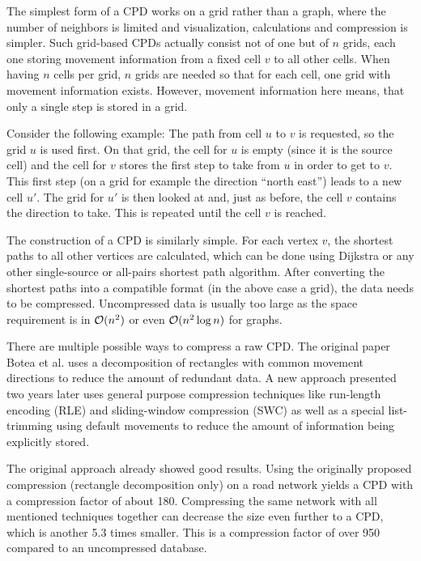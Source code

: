 			The simplest form of a CPD works on a grid rather than a graph, where the number of neighbors is limited and visualization, calculations and compression is simpler.
			Such grid-based CPDs actually consist not of one but of $n$ grids, each one storing movement information from a fixed cell $v$ to all other cells.
			When having $n$ cells per grid, $n$ grids are needed so that for each cell, one grid with movement information exists.
			However, movement information here means, that only a single step is stored in a grid.
			
			Consider the following example:
			The path from cell $u$ to $v$ is requested, so the grid $u$ is used first.
			On that grid, the cell for $u$ is empty (since it is the source cell) and the cell for $v$ stores the first step to take from $u$ in order to get to $v$.
			This first step (on a grid for example the direction \enquote{north east}) leads to a new cell $u'$.
			The grid for $u'$ is then looked at and, just as before, the cell $v$ contains the direction to take.
			This is repeated until the cell $v$ is reached.
			
			The construction of a CPD\cite{botea-cpd-2013} is similarly simple.
			For each vertex $v$, the shortest paths to all other vertices are calculated, which can be done using Dijkstra or any other single-source or all-pairs shortest path algorithm.
			After converting the shortest paths into a compatible format (in the above case a grid), the data needs to be compressed.
			Uncompressed data is usually too large as the space requirement is in $\mathcal{O}(n^2)$ or even $\mathcal{O}(n^2 \log n)$ for graphs.
			
			There are multiple possible ways to compress a raw CPD.
			The original paper Botea et al.\cite{botea-cpd-2011} uses a decomposition of rectangles with common movement directions to reduce the amount of redundant data.
			A new approach presented two years later uses general purpose compression techniques like run-length encoding (RLE) and sliding-window compression (SWC) as well as a special list-trimming using default movements to reduce the amount of information being explicitly stored\cite{botea-cpd-2013}.
			
			The original approach already showed good results.
			Using the originally proposed compression (rectangle decomposition only) on a road network yields a CPD with a compression factor of about 180.
			Compressing the same network with all mentioned techniques together can decrease the size even further to a CPD, which is another 5.3 times smaller.
			This is a compression factor of over 950 compared to an uncompressed database.
	
